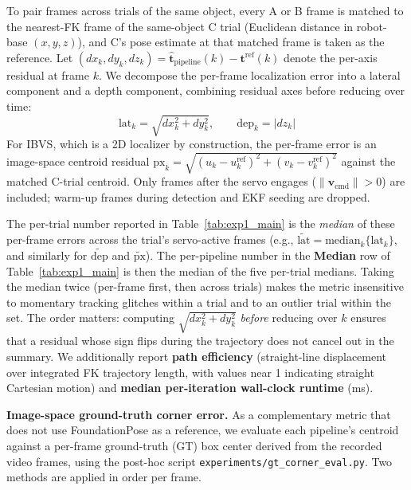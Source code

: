 \documentclass[letterpaper, 10 pt, conference]{ieeeconf}  %
\begin{document}
To pair frames across trials of the same object, every A or B frame is matched to the nearest-FK frame of the same-object C trial (Euclidean distance in robot-base $(x, y, z)$), and C's pose estimate at that matched frame is taken as the reference. Let $(dx_k, dy_k, dz_k) = \hat{\mathbf{t}}_{\text{pipeline}}(k) - \mathbf{t}^{\text{ref}}(k)$ denote the per-axis residual at frame $k$. We decompose the per-frame localization error into a lateral component and a depth component, combining residual axes before reducing over time:
\begin{equation}
\text{lat}_k = \sqrt{dx_k^2 + dy_k^2}, \qquad \text{dep}_k = |dz_k|
\label{eq:loc_err_per_frame}
\end{equation}
For IBVS, which is a 2D localizer by construction, the per-frame error is an image-space centroid residual $\text{px}_k = \sqrt{(u_k - u^{\text{ref}}_k)^2 + (v_k - v^{\text{ref}}_k)^2}$ against the matched C-trial centroid. Only frames after the servo engages ($\|\mathbf{v}_{\text{cmd}}\| > 0$) are included; warm-up frames during detection and EKF seeding are dropped.

The per-trial number reported in Table~\ref{tab:exp1_main} is the \emph{median} of these per-frame errors across the trial's servo-active frames (e.g., $\widetilde{\text{lat}} = \mathrm{median}_k \{\text{lat}_k\}$, and similarly for $\widetilde{\text{dep}}$ and $\widetilde{\text{px}}$). The per-pipeline number in the \textbf{Median} row of Table~\ref{tab:exp1_main} is then the median of the five per-trial medians. Taking the median twice (per-frame first, then across trials) makes the metric insensitive to momentary tracking glitches within a trial and to an outlier trial within the set. The order matters: computing $\sqrt{dx_k^2 + dy_k^2}$ \emph{before} reducing over $k$ ensures that a residual whose sign flips during the trajectory does not cancel out in the summary. We additionally report \textbf{path efficiency} (straight-line displacement over integrated FK trajectory length, with values near 1 indicating straight Cartesian motion) and \textbf{median per-iteration wall-clock runtime} (ms).

\textbf{Image-space ground-truth corner error.}
As a complementary metric that does not use FoundationPose as a reference, we evaluate each pipeline's centroid against a per-frame ground-truth (GT) box center derived from the recorded video frames, using the post-hoc script \texttt{experiments/gt\_corner\_eval.py}. Two methods are applied in order per frame.
\end{document}
